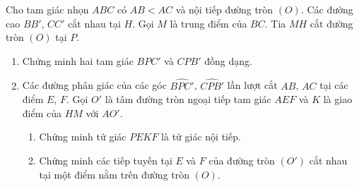 \begin{ex}%
Cho tam giác nhọn $ABC$ có $AB<AC$ và nội tiếp đường tròn $(O)$. Các đường cao $BB'$, $CC'$ cắt nhau tại $H$. Gọi $M$ là trung điểm của $BC$. Tia $MH$ cắt đường tròn $(O)$ tại $P$.
\begin{enumerate}
\item Chứng minh hai tam giác $BPC'$ và $CPB'$ đồng dạng.
\item Các đường phân giác của các góc $\widehat{BPC'}$, $\widehat{CPB'}$ lần lượt cắt $AB$, $AC$ tại các điểm $E$, $F$. Gọi $O'$ là tâm đường tròn ngoại tiếp tam giác $AEF$ và $K$ là giao điểm của $HM$ với $AO'$.
\begin{enumerate}
\item Chứng minh tứ giác $PEKF$ là tứ giác nội tiếp.
\item Chứng minh các tiếp tuyến tại $E$ và $F$ của đường tròn $(O')$ cắt nhau tại một điểm nằm trên đường tròn $(O)$.
\end{enumerate}
\end{enumerate}
\end{ex}
